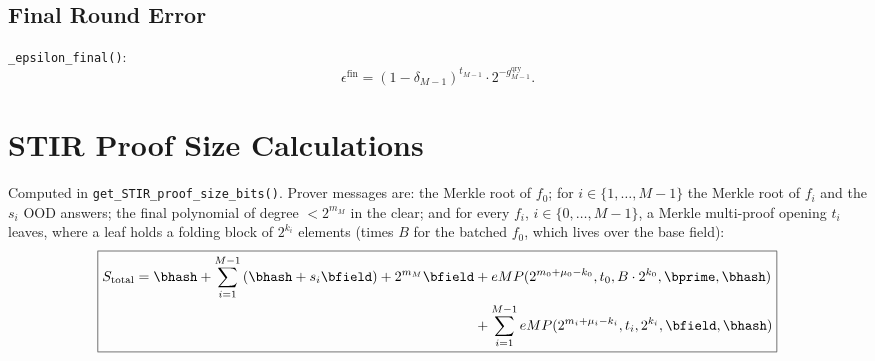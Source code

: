 \subsection{Final Round Error}
\verb|_epsilon_final()|:
\[
  \epsilon^{\mathrm{fin}} = (1-\delta_{M-1})^{t_{M-1}} \cdot 2^{-g^{\mathrm{qry}}_{M-1}}.
\]

\section{STIR Proof Size Calculations}

Computed in \verb|get_STIR_proof_size_bits()|. Prover messages are: the Merkle root of $f_0$; for $i \in \{1,\ldots,M-1\}$ the Merkle root of $f_i$ and the $s_i$ OOD answers; the final polynomial of degree $< 2^{m_M}$ in the clear; and for every $f_i$, $i\in\{0,\ldots,M-1\}$, a Merkle multi-proof opening $t_i$ leaves, where a leaf holds a folding block of $2^{k_i}$ elements (times $B$ for the batched $f_0$, which lives over the base field):
\[
\boxed{
\begin{align}
S_{\mathrm{total}}
  = \bhash + \sum_{i=1}^{M-1}\left(\bhash + s_i \bfield\right) + 2^{m_M}\bfield
  &+ eMP(2^{m_0+\mu_0-k_0}, t_0, B\cdot 2^{k_0}, \bprime, \bhash) \\
  &+ \sum_{i=1}^{M-1} eMP(2^{m_i+\mu_i-k_i}, t_i, 2^{k_i}, \bfield, \bhash)
\end{align}
}
\]
